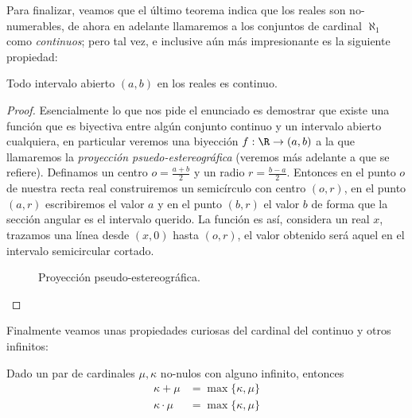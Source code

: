 \documentclass[11pt,oneside,a4paper]{book}
\begin{document}
Para finalizar, veamos que el último teorema indica que los reales son no-numerables, de ahora en adelante llamaremos a los conjuntos de cardinal $\aleph_1$ como \textit{continuos}; pero tal vez, e inclusive aún más impresionante es la siguiente propiedad:
\begin{thm}
Todo intervalo abierto $(a,b)$ en los reales es continuo.
\end{thm}
\begin{proof}
Esencialmente lo que nos pide el enunciado es demostrar que existe una función que es biyectiva entre algún conjunto continuo y un intervalo abierto cualquiera, en particular veremos una biyección $f:\R\rightarrow(a,b)$ a la que llamaremos la \textit{proyección psuedo-estereográfica} (veremos más adelante a que se refiere). Definamos un centro $o=\frac{a+b}{2}$ y un radio $r=\frac{b-a}{2}$. Entonces en el punto $o$ de nuestra recta real construiremos un semicírculo con centro $(o,r)$, en el punto $(a,r)$ escribiremos el valor $a$ y en el punto $(b,r)$ el valor $b$ de forma que la sección angular es el intervalo querido. La función es así, considera un real $x$, trazamos una línea desde $(x,0)$ hasta $(o,r)$, el valor obtenido será aquel en el intervalo semicircular cortado.
\begin{figure}
\centering
{}
\caption{Proyección pseudo-estereográfica.}
\end{figure}
\end{proof}
Finalmente veamos unas propiedades curiosas del cardinal del continuo y otros infinitos:
\begin{thm}
Dado un par de cardinales $\mu,\kappa$ no-nulos con alguno infinito, entonces
\begin{align*}
\kappa+\mu&=\max\{\kappa,\mu\}\\
\kappa\cdot\mu&=\max\{\kappa,\mu\}
\end{align*}
\end{thm}
\end{document}
